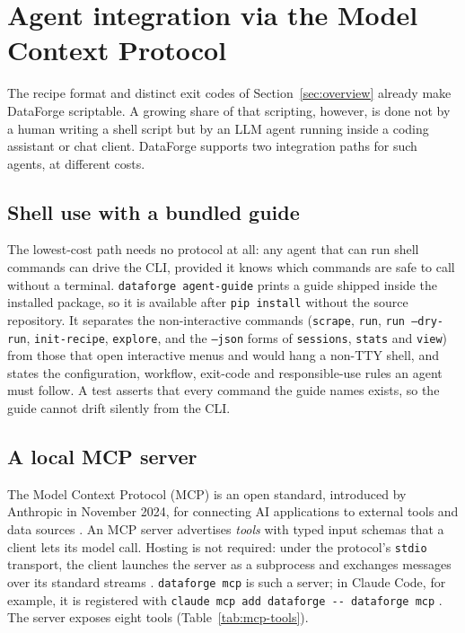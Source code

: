 \documentclass[11pt]{article}
\begin{document}
\section{Agent integration via the Model Context Protocol}
\label{sec:mcp}

The recipe format and distinct exit codes of Section~\ref{sec:overview} already make
DataForge scriptable. A growing share of that scripting, however, is done
not by a human writing a shell script but by an LLM agent running inside a
coding assistant or chat client. DataForge supports two integration paths
for such agents, at different costs.

\subsection{Shell use with a bundled guide}
The lowest-cost path needs no protocol at all: any agent that can run
shell commands can drive the CLI, provided it knows which commands are
safe to call without a terminal. \texttt{dataforge agent-guide} prints a
guide shipped inside the installed package, so it is available after
\texttt{pip install} without the source repository. It separates the
non-interactive commands (\texttt{scrape}, \texttt{run}, \texttt{run --dry-run},
\texttt{init-recipe}, \texttt{explore}, and the \texttt{--json} forms of
\texttt{sessions}, \texttt{stats} and \texttt{view}) from those that open
interactive menus and would hang a non-TTY shell, and states the
configuration, workflow, exit-code and responsible-use rules an agent must
follow. A test asserts that every command the guide names exists, so the
guide cannot drift silently from the CLI.

\subsection{A local MCP server}
The Model Context Protocol (MCP) is an open standard, introduced by
Anthropic in November 2024, for connecting AI applications to external
tools and data sources \cite{anthropic2024mcp}. An MCP server advertises
\emph{tools} with typed input schemas that a client lets its model call.
Hosting is not required: under the protocol's \texttt{stdio} transport,
the client launches the server as a subprocess and exchanges messages over
its standard streams \cite{mcpspec2026}. \texttt{dataforge mcp} is such a
server; in Claude Code, for example, it is registered with
\texttt{claude mcp add dataforge -{}- dataforge mcp}
\cite{claudecodemcp}. The server exposes eight tools
(Table~\ref{tab:mcp-tools}).
\end{document}

